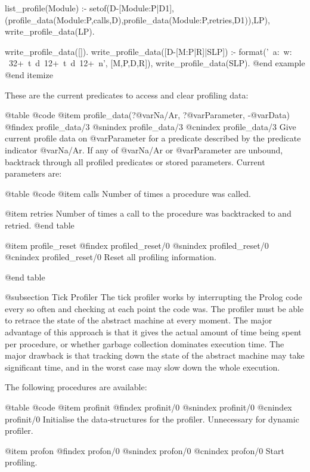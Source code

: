 {{{{{{{list_profile(Module) :-
        setof(D-[Module:P|D1],(profile_data(Module:P,calls,D),profile_data(Module:P,retries,D1)),LP),
        write_profile_data(LP).

write_profile_data([]).
write_profile_data([D-[M:P|R]|SLP]) :-
        format('~a:~w: ~32+~t~d~12+~t~d~12+~n', [M,P,D,R]),
        write_profile_data(SLP).
@end example
@end itemize

These are  the current predicates to access and clear profiling data:

@table @code
@item profile_data(?@var{Na/Ar}, ?@var{Parameter}, -@var{Data})
@findex profile_data/3
@snindex profile_data/3
@cnindex profile_data/3
Give current profile data on @var{Parameter} for a predicate described
by the predicate indicator @var{Na/Ar}. If any of @var{Na/Ar} or
@var{Parameter} are unbound, backtrack through all profiled predicates
or stored parameters. Current parameters are:

@table @code
@item calls
Number of times a procedure was called.

@item retries
 Number of times a call to the procedure was backtracked to and retried.
@end table

@item profile_reset
@findex profiled_reset/0
@snindex profiled_reset/0
@cnindex profiled_reset/0
Reset all profiling information.

@end table

@subsection Tick Profiler
The tick profiler works by interrupting the Prolog code every so often
and checking at each point the code was. The profiler must be able to
retrace the state of the abstract machine at every moment. The major
advantage of this approach is that it gives the actual amount of time
being spent per procedure, or whether garbage collection dominates
execution time. The major drawback is that tracking down the state of
the abstract machine may take significant time, and in the worst case
may slow down the whole execution.

The following procedures are available:

@table @code
@item profinit
@findex profinit/0
@snindex profinit/0
@cnindex profinit/0
Initialise the data-structures for the profiler. Unnecessary for
dynamic profiler.

@item profon
@findex profon/0
@snindex profon/0
@cnindex profon/0
Start profiling.

}}}}}}}
